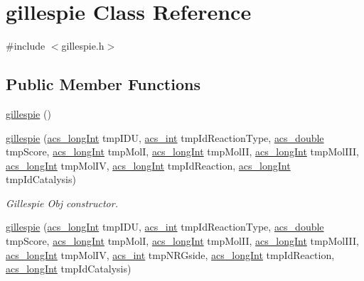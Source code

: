 \hypertarget{a00012}{\section{gillespie Class Reference}
\label{a00012}
}


{\ttfamily \#include $<$gillespie.\-h$>$}

\subsection*{Public Member Functions}
\begin{DoxyCompactItemize}
\item 
\hyperlink{a00012_a1487279f0440557a26662ff6356b8c17}{gillespie} ()
\item 
\hyperlink{a00012_af763c24d6107109108d32b5cc21c116a}{gillespie} (\hyperlink{a00024_a19319d75f02db4308bc5c0026d98cd85}{acs\-\_\-long\-Int} tmp\-I\-D\-U, \hyperlink{a00024_a8d277355641a098190360234e2ebde35}{acs\-\_\-int} tmp\-Id\-Reaction\-Type, \hyperlink{a00024_ab776853a005fcbf56af0424a2a4dd607}{acs\-\_\-double} tmp\-Score, \hyperlink{a00024_a19319d75f02db4308bc5c0026d98cd85}{acs\-\_\-long\-Int} tmp\-Mol\-I, \hyperlink{a00024_a19319d75f02db4308bc5c0026d98cd85}{acs\-\_\-long\-Int} tmp\-Mol\-I\-I, \hyperlink{a00024_a19319d75f02db4308bc5c0026d98cd85}{acs\-\_\-long\-Int} tmp\-Mol\-I\-I\-I, \hyperlink{a00024_a19319d75f02db4308bc5c0026d98cd85}{acs\-\_\-long\-Int} tmp\-Mol\-I\-V, \hyperlink{a00024_a19319d75f02db4308bc5c0026d98cd85}{acs\-\_\-long\-Int} tmp\-Id\-Reaction, \hyperlink{a00024_a19319d75f02db4308bc5c0026d98cd85}{acs\-\_\-long\-Int} tmp\-Id\-Catalysis)
\begin{DoxyCompactList}\small\item\em Gillespie Obj constructor. \end{DoxyCompactList}\item 
\hyperlink{a00012_a0a38f4fd563208beba389f7f8e8eed4a}{gillespie} (\hyperlink{a00024_a19319d75f02db4308bc5c0026d98cd85}{acs\-\_\-long\-Int} tmp\-I\-D\-U, \hyperlink{a00024_a8d277355641a098190360234e2ebde35}{acs\-\_\-int} tmp\-Id\-Reaction\-Type, \hyperlink{a00024_ab776853a005fcbf56af0424a2a4dd607}{acs\-\_\-double} tmp\-Score, \hyperlink{a00024_a19319d75f02db4308bc5c0026d98cd85}{acs\-\_\-long\-Int} tmp\-Mol\-I, \hyperlink{a00024_a19319d75f02db4308bc5c0026d98cd85}{acs\-\_\-long\-Int} tmp\-Mol\-I\-I, \hyperlink{a00024_a19319d75f02db4308bc5c0026d98cd85}{acs\-\_\-long\-Int} tmp\-Mol\-I\-I\-I, \hyperlink{a00024_a19319d75f02db4308bc5c0026d98cd85}{acs\-\_\-long\-Int} tmp\-Mol\-I\-V, \hyperlink{a00024_a8d277355641a098190360234e2ebde35}{acs\-\_\-int} tmp\-N\-R\-Gside, \hyperlink{a00024_a19319d75f02db4308bc5c0026d98cd85}{acs\-\_\-long\-Int} tmp\-Id\-Reaction, \hyperlink{a00024_a19319d75f02db4308bc5c0026d98cd85}{acs\-\_\-long\-Int} tmp\-Id\-Catalysis)

\end{DoxyCompactItemize}
